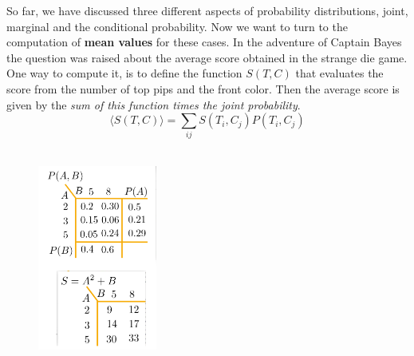 \documentclass[12pt, a4paper]{scrartcl}
\begin{document}
So far, we have discussed three different aspects of probability distributions, joint, marginal and the conditional probability.
Now we want to turn to the computation of  \textbf{mean values} for these cases. In the adventure of Captain Bayes the question was raised about the average score obtained in the strange die game. One way to compute it, is to define the function $S(T,C)$ that evaluates the score from the number of top pips and the front color. Then the average score is given by the \textit{sum of this function times the joint probability}.\\
\begin{equation*}\boxed{\langle S(T,C)\rangle= \sum_{ij}S(T_i,C_j)P(T_i,C_j)}\end{equation*}\\
\begin{figure}[H]
	\centering
	\includegraphics[width=0.35\textwidth]{3_8.png}
\end{figure}
\\
\end{document}
